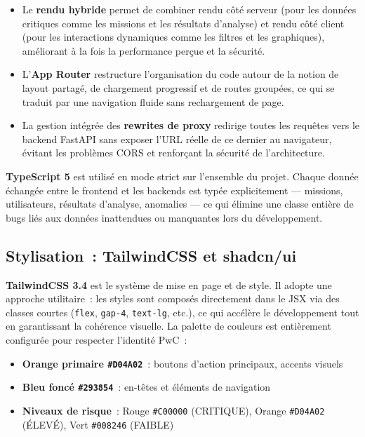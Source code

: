 \begin{itemize}[leftmargin=1.5em]
  \item Le \textbf{rendu hybride} permet de combiner rendu côté serveur (pour les données critiques comme les missions et les résultats d'analyse) et rendu côté client (pour les interactions dynamiques comme les filtres et les graphiques), améliorant à la fois la performance perçue et la sécurité.
  \item L'\textbf{App Router} restructure l'organisation du code autour de la notion de layout partagé, de chargement progressif et de routes groupées, ce qui se traduit par une navigation fluide sans rechargement de page.
  \item La gestion intégrée des \textbf{rewrites de proxy} redirige toutes les requêtes vers le backend FastAPI sans exposer l'URL réelle de ce dernier au navigateur, évitant les problèmes CORS et renforçant la sécurité de l'architecture.
\end{itemize}

\textbf{TypeScript 5} est utilisé en mode strict sur l'ensemble du projet. Chaque donnée échangée entre le frontend et les backends est typée explicitement --- missions, utilisateurs, résultats d'analyse, anomalies --- ce qui élimine une classe entière de bugs liés aux données inattendues ou manquantes lors du développement.

\subsection{Stylisation~: TailwindCSS et shadcn/ui}

\textbf{TailwindCSS 3.4} est le système de mise en page et de style. Il adopte une approche utilitaire~: les styles sont composés directement dans le JSX via des classes courtes (\texttt{flex}, \texttt{gap-4}, \texttt{text-lg}, etc.), ce qui accélère le développement tout en garantissant la cohérence visuelle. La palette de couleurs est entièrement configurée pour respecter l'identité PwC~:

\begin{itemize}[leftmargin=1.5em]
  \item \textbf{Orange primaire \texttt{\#D04A02}}~: boutons d'action principaux, accents visuels
  \item \textbf{Bleu foncé \texttt{\#293854}}~: en-têtes et éléments de navigation
  \item \textbf{Niveaux de risque}~: Rouge \texttt{\#C00000} (CRITIQUE), Orange \texttt{\#D04A02} (ÉLEVÉ), Vert \texttt{\#008246} (FAIBLE)
\end{itemize}

